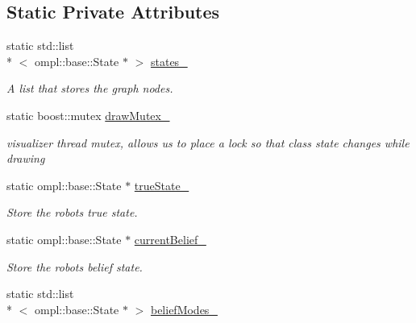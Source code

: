 \subsection*{Static Private Attributes}
\begin{DoxyCompactItemize}
\item 
\hypertarget{class_visualizer_ad6771691744b01cc232ea171e1e2a4ab}{static std\-::list\\*
$<$ ompl\-::base\-::\-State $\ast$ $>$ \hyperlink{class_visualizer_ad6771691744b01cc232ea171e1e2a4ab}{states\-\_\-}}\label{class_visualizer_ad6771691744b01cc232ea171e1e2a4ab}

\begin{DoxyCompactList}\small\item\em A list that stores the graph nodes. \end{DoxyCompactList}\item 
\hypertarget{class_visualizer_a7ca3a80de8106a9d53b8b25247aadc07}{static boost\-::mutex \hyperlink{class_visualizer_a7ca3a80de8106a9d53b8b25247aadc07}{draw\-Mutex\-\_\-}}\label{class_visualizer_a7ca3a80de8106a9d53b8b25247aadc07}

\begin{DoxyCompactList}\small\item\em visualizer thread mutex, allows us to place a lock so that class state changes while drawing \end{DoxyCompactList}\item 
\hypertarget{class_visualizer_a2a25f3b2372418e1088cd889f26df95d}{static ompl\-::base\-::\-State $\ast$ \hyperlink{class_visualizer_a2a25f3b2372418e1088cd889f26df95d}{true\-State\-\_\-}}\label{class_visualizer_a2a25f3b2372418e1088cd889f26df95d}

\begin{DoxyCompactList}\small\item\em Store the robots true state. \end{DoxyCompactList}\item 
\hypertarget{class_visualizer_a4f39505b9d7a4590ade4d87b1a9004d7}{static ompl\-::base\-::\-State $\ast$ \hyperlink{class_visualizer_a4f39505b9d7a4590ade4d87b1a9004d7}{current\-Belief\-\_\-}}\label{class_visualizer_a4f39505b9d7a4590ade4d87b1a9004d7}

\begin{DoxyCompactList}\small\item\em Store the robots belief state. \end{DoxyCompactList}\item 
\hypertarget{class_visualizer_a13a9427e5bbd1301b615bf81ed2bff99}{static std\-::list\\*
$<$ ompl\-::base\-::\-State $\ast$ $>$ \hyperlink{class_visualizer_a13a9427e5bbd1301b615bf81ed2bff99}{belief\-Modes\-\_\-}}\label{class_visualizer_a13a9427e5bbd1301b615bf81ed2bff99}


\end{DoxyCompactItemize}
